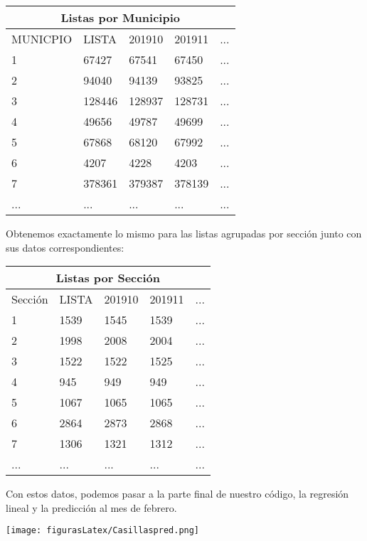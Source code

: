 \documentclass[12pt]{article}
\begin{document}
\begin{center}
\begin{tabular}{ |p{3cm}||p{3cm}|p{3cm}|p{3cm}|p{3cm}| }
 \hline
 \multicolumn{5}{|c|}{Listas por Municipio} \\
 \hline
 MUNICPIO & LISTA & 201910 & 201911 & ...\\
 \hline
 1 & 67427 & 67541 & 67450 & ...\\
 2 & 94040 &  94139 & 93825 & ...\\
 3 & 128446 & 128937 & 128731 & ...\\
 4 & 49656  & 49787  & 49699 & ...\\
 5 & 67868  & 68120 &  67992 & ...\\
 6 &  4207   & 4228  &  4203 & ...\\
 7 &  378361 & 379387 & 378139 & ...\\
 ... & ... & ... & ... & ...\\
 \hline
\end{tabular}\label{table2.1}
\end{center}

Obtenemos exactamente lo mismo para las listas agrupadas por sección junto con sus datos correspondientes:

\begin{center}
\begin{tabular}{ |p{3cm}||p{3cm}|p{3cm}|p{3cm}|p{3cm}| }
 \hline
 \multicolumn{5}{|c|}{Listas por Sección} \\
 \hline
 Sección & LISTA & 201910 & 201911 & ...\\
 \hline
 1 & 1539  &  1545  &  1539 & ...\\
 2 & 1998  &  2008  &  2004 & ...\\
 3 &  1522   & 1522  &  1525 & ...\\
 4 & 945   &  949   &  949 & ...\\
 5 & 1067   & 1065  &  1065 & ...\\
 6 &  2864   & 2873 &   2868 & ...\\
 7 & 1306   & 1321  &  1312 & ...\\
 ... & ... & ... & ... & ...\\
 \hline
\end{tabular}\label{table2.2}
\end{center}

Con estos datos, podemos pasar a la parte final de nuestro código, la regresión lineal y la predicción al mes de febrero.

\begin{center}
\texttt{[image: figurasLatex/Casillaspred.png]}\label{fig1.4} 
\end{center}
\end{document}
